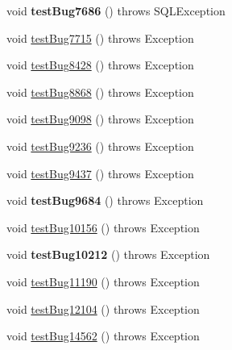 \begin{DoxyCompactItemize}
void {\bfseries test\+Bug7686} ()  throws S\+Q\+L\+Exception 
\item 
void \mbox{\hyperlink{classtestsuite_1_1regression_1_1_result_set_regression_test_ad13bf1855a9ea26c44b830e577097a90}{test\+Bug7715}} ()  throws Exception 
\item 
void \mbox{\hyperlink{classtestsuite_1_1regression_1_1_result_set_regression_test_a195b8d1a9669b382f6b4dc0b8866224c}{test\+Bug8428}} ()  throws Exception 
\item 
void \mbox{\hyperlink{classtestsuite_1_1regression_1_1_result_set_regression_test_a2d7ec45736b6d8ba77d988e4dae8c5a0}{test\+Bug8868}} ()  throws Exception 
\item 
void \mbox{\hyperlink{classtestsuite_1_1regression_1_1_result_set_regression_test_a73f559230b24a5776a1ce47569f3f82a}{test\+Bug9098}} ()  throws Exception 
\item 
void \mbox{\hyperlink{classtestsuite_1_1regression_1_1_result_set_regression_test_ad29ed5c9d0749bc7bbdcbbacd1b45910}{test\+Bug9236}} ()  throws Exception 
\item 
void \mbox{\hyperlink{classtestsuite_1_1regression_1_1_result_set_regression_test_aa1115212e57fbb7e7c76c150db7d5ff5}{test\+Bug9437}} ()  throws Exception 
\item 
\mbox{\label{classtestsuite_1_1regression_1_1_result_set_regression_test_a8ba4d015c272ce27729cbff91f0e6b79}} 
void {\bfseries test\+Bug9684} ()  throws Exception 
\item 
void \mbox{\hyperlink{classtestsuite_1_1regression_1_1_result_set_regression_test_ae61d054fda8ca9078ed587e19b6d035e}{test\+Bug10156}} ()  throws Exception 
\item 
\mbox{\label{classtestsuite_1_1regression_1_1_result_set_regression_test_aaa285516b639e4fe11fefda153aebb94}} 
void {\bfseries test\+Bug10212} ()  throws Exception 
\item 
void \mbox{\hyperlink{classtestsuite_1_1regression_1_1_result_set_regression_test_aeb922ab7f293e6e7184ea654eb06a00a}{test\+Bug11190}} ()  throws Exception 
\item 
void \mbox{\hyperlink{classtestsuite_1_1regression_1_1_result_set_regression_test_a5967a08c14eff5f2158876c10b97da26}{test\+Bug12104}} ()  throws Exception 
\item 
void \mbox{\hyperlink{classtestsuite_1_1regression_1_1_result_set_regression_test_ac1d2232b96f37d2f6ce4fbf52264cff8}{test\+Bug14562}} ()  throws Exception 

\end{DoxyCompactItemize}
